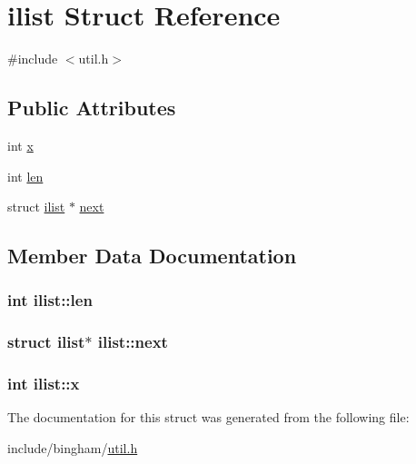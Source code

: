 \hypertarget{structilist}{
\section{ilist Struct Reference}
\label{structilist}
}


{\ttfamily \#include $<$util.h$>$}

\subsection*{Public Attributes}
\begin{DoxyCompactItemize}
\item 
int \hyperlink{structilist_a70989785083c6153a4d2e16a78401802}{x}
\item 
int \hyperlink{structilist_adc95b26d3dba44e7d7fa29e1c7518486}{len}
\item 
struct \hyperlink{structilist}{ilist} $\ast$ \hyperlink{structilist_a3a12b45e62b91051a3a6af9f166fd442}{next}
\end{DoxyCompactItemize}


\subsection{Member Data Documentation}
\hypertarget{structilist_adc95b26d3dba44e7d7fa29e1c7518486}{
\subsubsection[{len}]{\setlength{\rightskip}{0pt plus 5cm}int {\bf ilist::len}}}
\label{structilist_adc95b26d3dba44e7d7fa29e1c7518486}
\hypertarget{structilist_a3a12b45e62b91051a3a6af9f166fd442}{
\subsubsection[{next}]{\setlength{\rightskip}{0pt plus 5cm}struct {\bf ilist}$\ast$ {\bf ilist::next}}}
\label{structilist_a3a12b45e62b91051a3a6af9f166fd442}
\hypertarget{structilist_a70989785083c6153a4d2e16a78401802}{
\subsubsection[{x}]{\setlength{\rightskip}{0pt plus 5cm}int {\bf ilist::x}}}
\label{structilist_a70989785083c6153a4d2e16a78401802}


The documentation for this struct was generated from the following file:\begin{DoxyCompactItemize}
\item 
include/bingham/\hyperlink{util_8h}{util.h}\end{DoxyCompactItemize}
